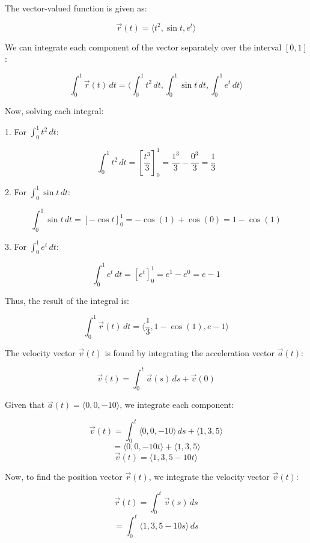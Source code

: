 \documentclass{report}
\begin{document}
\sol

The vector-valued function is given as:

\[
	\vec{r}(t) = \langle t^2, \sin t, e^t \rangle
\]

We can integrate each component of the vector separately over the interval \([0, 1]\):

\[
	\int_0^1 \vec{r}(t) \, dt = \langle \int_0^1 t^2 \, dt, \int_0^1 \sin t \, dt, \int_0^1 e^t \, dt \rangle
\]

Now, solving each integral:

1. For \(\int_0^1 t^2 \, dt\):

\[
	\int_0^1 t^2 \, dt = \left[ \frac{t^3}{3} \right]_0^1 = \frac{1^3}{3} - \frac{0^3}{3} = \frac{1}{3}
\]

2. For \(\int_0^1 \sin t \, dt\):

\[
	\int_0^1 \sin t \, dt = \left[ -\cos t \right]_0^1 = -\cos(1) + \cos(0) = 1 - \cos(1)
\]

3. For \(\int_0^1 e^t \, dt\):

\[
	\int_0^1 e^t \, dt = \left[ e^t \right]_0^1 = e^1 - e^0 = e - 1
\]

Thus, the result of the integral is:

\[
	\int_0^1 \vec{r}(t) \, dt = \langle \frac{1}{3}, 1 - \cos(1), e - 1 \rangle
\]


\sol

The velocity vector \(\vec{v}(t)\) is found by integrating the acceleration vector \(\vec{a}(t)\):

\[
	\vec{v}(t) = \int_0^t \vec{a}(s) \, ds + \vec{v}(0)
\]

Given that \(\vec{a}(t) = \langle 0, 0, -10 \rangle\), we integrate each component:

\[
	\vec{v}(t) = \int_0^t \langle 0, 0, -10 \rangle \, ds + \langle 1, 3, 5 \rangle
\]
\[
	= \langle 0, 0, -10t \rangle + \langle 1, 3, 5 \rangle
\]
\[
	\vec{v}(t) = \langle 1, 3, 5 - 10t \rangle
\]

Now, to find the position vector \(\vec{r}(t)\), we integrate the velocity vector \(\vec{v}(t)\):

\[
	\vec{r}(t) = \int_0^t \vec{v}(s) \, ds
\]
\[
	= \int_0^t \langle 1, 3, 5 - 10s \rangle \, ds
\]
\end{document}
